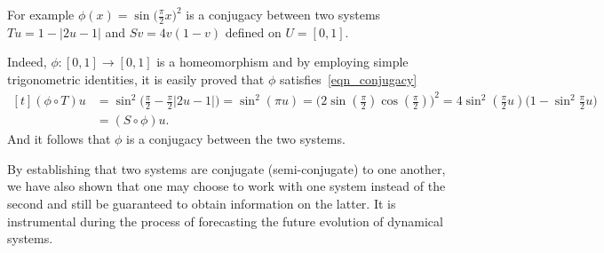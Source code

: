 \begin{Example}\rm
  For example $\phi(x)=\sin{\big(\frac{\pi}{2}x\big)}^2$ is a conjugacy between two systems $Tu=1-|2u-1|$ and $Sv=4v(1-v)$  defined on $U=[0,1]$.  

  Indeed, $\phi:[0,1]\to[0,1]$ is a homeomorphism and by employing simple trigonometric identities, it is easily proved that $\phi$ satisfies~\ref{eqn_conjugacy}
  \[
    \begin{aligned}[t]
      (\phi\circ{T})u 
                &=\sin^{2}\Big(\frac{\pi}{2} - \frac{\pi}{2}|2u-1|\Big) = \sin^{2}(\pi{u})={\Big(2\sin(\frac{\pi}{2})\cos(\frac{\pi}{2})\Big)}^{2}=4\sin^{2}(\frac{\pi}{2}u)\Big(1-\sin^{2}\frac{\pi}{2}u\Big) \\
                                    &=({S}\circ\phi)u.
    \end{aligned}
\]
And it follows that $\phi$ is a conjugacy between the two systems.
\end{Example}


By establishing that two systems are conjugate (semi-conjugate) to one another, we have also shown that one may choose to work with one system instead of the second and still be guaranteed to obtain information on the latter. It is instrumental during the process of forecasting the future evolution of dynamical systems. 

